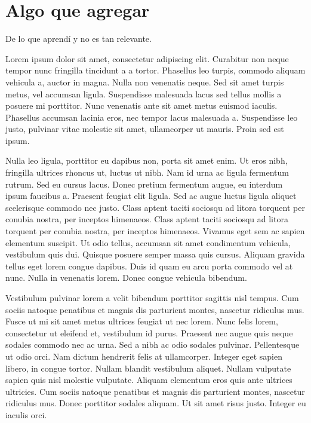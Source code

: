 \chapter{Algo que agregar}

De lo que aprendí y no es tan relevante.

Lorem ipsum dolor sit amet, consectetur adipiscing elit. Curabitur non
neque tempor nunc fringilla tincidunt a a tortor. Phasellus leo
turpis, commodo aliquam vehicula a, auctor in magna. Nulla non
venenatis neque. Sed sit amet turpis metus, vel accumsan
ligula. Suspendisse malesuada lacus sed tellus mollis a posuere mi
porttitor. Nunc venenatis ante sit amet metus euismod
iaculis. Phasellus accumsan lacinia eros, nec tempor lacus malesuada
a. Suspendisse leo justo, pulvinar vitae molestie sit amet,
ullamcorper ut mauris. Proin sed est ipsum.

Nulla leo ligula, porttitor eu dapibus non, porta sit amet enim. Ut
eros nibh, fringilla ultrices rhoncus ut, luctus ut nibh. Nam id urna
ac ligula fermentum rutrum. Sed eu cursus lacus. Donec pretium
fermentum augue, eu interdum ipsum faucibus a. Praesent feugiat elit
ligula. Sed ac augue luctus ligula aliquet scelerisque commodo nec
justo. Class aptent taciti sociosqu ad litora torquent per conubia
nostra, per inceptos himenaeos. Class aptent taciti sociosqu ad litora
torquent per conubia nostra, per inceptos himenaeos. Vivamus eget sem
ac sapien elementum suscipit. Ut odio tellus, accumsan sit amet
condimentum vehicula, vestibulum quis dui. Quisque posuere semper
massa quis cursus. Aliquam gravida tellus eget lorem congue
dapibus. Duis id quam eu arcu porta commodo vel at nunc. Nulla in
venenatis lorem. Donec congue vehicula bibendum.

Vestibulum pulvinar lorem a velit bibendum porttitor sagittis nisl
tempus. Cum sociis natoque penatibus et magnis dis parturient montes,
nascetur ridiculus mus. Fusce ut mi sit amet metus ultrices feugiat ut
nec lorem. Nunc felis lorem, consectetur ut eleifend et, vestibulum id
purus. Praesent nec augue quis neque sodales commodo nec ac urna. Sed
a nibh ac odio sodales pulvinar. Pellentesque ut odio orci. Nam dictum
hendrerit felis at ullamcorper. Integer eget sapien libero, in congue
tortor. Nullam blandit vestibulum aliquet. Nullam vulputate sapien
quis nisl molestie vulputate. Aliquam elementum eros quis ante
ultrices ultricies. Cum sociis natoque penatibus et magnis dis
parturient montes, nascetur ridiculus mus. Donec porttitor sodales
aliquam. Ut sit amet risus justo. Integer eu iaculis orci.


